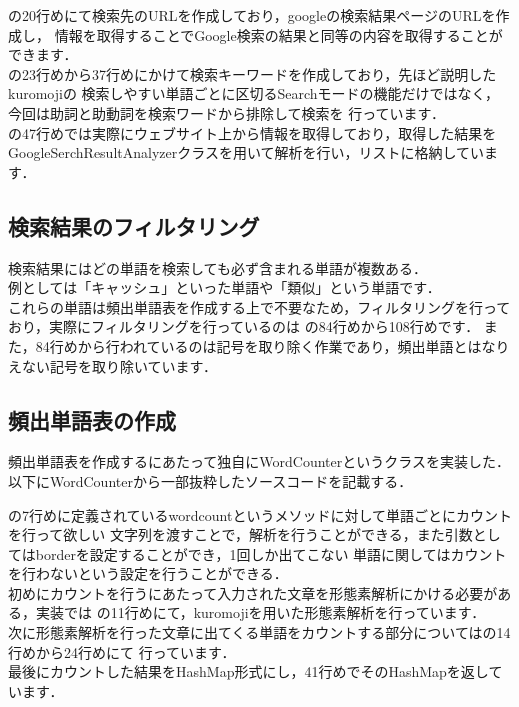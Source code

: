 の20行めにて検索先のURLを作成しており，googleの検索結果ページのURLを作成し，
情報を取得することでGoogle検索の結果と同等の内容を取得することができます．\\

の23行めから37行めにかけて検索キーワードを作成しており，先ほど説明したkuromojiの
検索しやすい単語ごとに区切るSearchモードの機能だけではなく，今回は助詞と助動詞を検索ワードから排除して検索を
行っています．\\

の47行めでは実際にウェブサイト上から情報を取得しており，取得した結果を
GoogleSerchResultAnalyzerクラスを用いて解析を行い，リストに格納しています．\\



\subsection{検索結果のフィルタリング}
検索結果にはどの単語を検索しても必ず含まれる単語が複数ある．\\
例としては「キャッシュ」といった単語や「類似」という単語です．\\
これらの単語は頻出単語表を作成する上で不要なため，フィルタリングを行っており，実際にフィルタリングを行っているのは
の84行めから108行めです．
また，84行めから行われているのは記号を取り除く作業であり，頻出単語とはなりえない記号を取り除いています．\\

\subsection{頻出単語表の作成}
頻出単語表を作成するにあたって独自にWordCounterというクラスを実装した．\\

以下にWordCounterから一部抜粋したソースコードを記載する．



の7行めに定義されているwordcountというメソッドに対して単語ごとにカウントを行って欲しい
文字列を渡すことで，解析を行うことができる，また引数としてはborderを設定することができ，1回しか出てこない
単語に関してはカウントを行わないという設定を行うことができる．\\

初めにカウントを行うにあたって入力された文章を形態素解析にかける必要がある，実装では
の11行めにて，kuromojiを用いた形態素解析を行っています．
\\

次に形態素解析を行った文章に出てくる単語をカウントする部分についてはの14行めから24行めにて
行っています．\\

最後にカウントした結果をHashMap形式にし，41行めでそのHashMapを返しています．\\


